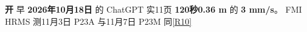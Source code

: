 \documentclass[11pt,a4paper]{article}
\numberwithin{equation}{section}
\numberwithin{figure}{section}
\begin{document}
\textbf{{\cjkfont 开}\allowbreak{}} {\cjkfont 早}\allowbreak{} \textbf{2026{\cjkfont 年}\allowbreak{}10{\cjkfont 月}\allowbreak{}18{\cjkfont 日}\allowbreak{}} {\cjkfont 的}\allowbreak{} ChatGPT {\cjkfont 实}\allowbreak{}11{\cjkfont 页}\allowbreak{} \textbf{120{\cjkfont 秒}\allowbreak{}0.36 m} {\cjkfont 的}\allowbreak{} \textbf{3 mm/\allowbreak{}s}{\cjkfont 。}\allowbreak{} FMI HRMS {\cjkfont 测}\allowbreak{}11{\cjkfont 月}\allowbreak{}3{\cjkfont 日}\allowbreak{} P23A {\cjkfont 与}\allowbreak{}11{\cjkfont 月}\allowbreak{}7{\cjkfont 日}\allowbreak{} P23M {\cjkfont 同}\allowbreak{}\hyperlink{ref-R10}{[R10]}
\end{document}
